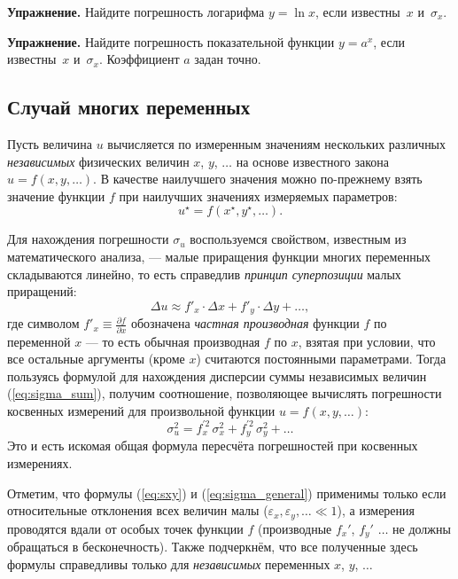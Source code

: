 {\footnotesize
\textbf{Упражнение.} Найдите погрешность
логарифма $y=\ln x$, если известны~$x$ и~$\sigma_{x}$.\par
}%

{\footnotesize
\textbf{Упражнение.} Найдите погрешность
показательной функции $y=a^{x}$, если известны~$x$ и~$\sigma_{x}$.
Коэффициент $a$ задан точно.\par
}%

\subsection{Случай многих переменных}

Пусть величина $u$ вычисляется по измеренным значениям нескольких
различных \emph{независимых} физических величин $x$, $y$, $\ldots$
на основе известного закона $u=f\!\left(x,y,\ldots\right)$. В качестве
наилучшего значения можно по-прежнему взять значение функции $f$
при наилучших значениях измеряемых параметров:
\[
u^{\star}=f\!\left(x^{\star},y^{\star},\ldots\right).
\]

Для нахождения погрешности $\sigma_{u}$ воспользуемся свойством,
известным из математического анализа, --- малые приращения
функции многих переменных складываются линейно, то есть справедлив
\emph{принцип суперпозиции} малых приращений:
\[
\Delta u\approx f'_{x}\cdot\Delta x+f'_{y}\cdot\Delta y+\ldots,
\]
где символом $f'_{x}\equiv\frac{\partial f}{\partial x}$ обозначена
\emph{частная производная} функции $f$ по переменной $x$ ---
то есть обычная производная $f$ по $x$, взятая при условии, что
все остальные аргументы (кроме $x$) считаются постоянными параметрами.
Тогда пользуясь формулой для нахождения дисперсии суммы независимых
величин (\ref{eq:sigma_sum}), получим соотношение, позволяющее вычислять
погрешности косвенных измерений для произвольной функции $u=f\left(x,y,\ldots\right)$:
\begin{equation}
\boxed{\sigma_{u}^{2}=f_{x}^{\prime2}\,\sigma_{x}^{2}+f_{y}^{\prime2}\,\sigma_{y}^{2}+\ldots}\label{eq:sigma_general}
\end{equation}
Это и есть искомая общая формула пересчёта погрешностей при косвенных
измерениях.

Отметим, что формулы (\ref{eq:sxy}) и (\ref{eq:sigma_general}) применимы
только если относительные отклонения всех величин малы ($\varepsilon_{x},\varepsilon_{y},\ldots\ll1$),
а измерения проводятся вдали от особых точек функции $f$ (производные
$f_{x}'$, $f_{y}'$ $\ldots$ не должны обращаться в бесконечность).
Также подчеркнём, что все полученные здесь формулы справедливы только
для \emph{независимых} переменных $x$, $y$, $\ldots$

